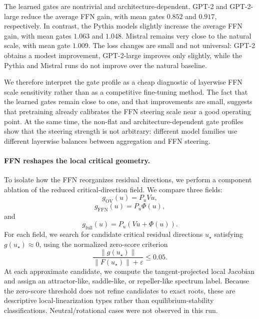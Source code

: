 \documentclass[11pt]{article}
\begin{document}
The learned gates are nontrivial and architecture-dependent. GPT-2 and
GPT-2-large reduce the average FFN gain, with mean gates $0.852$ and $0.917$,
respectively. In contrast, the Pythia models slightly increase the average FFN
gain, with mean gates $1.063$ and $1.048$. Mistral remains very close to the
natural scale, with mean gate $1.009$. The loss changes are small and not
universal: GPT-2 obtains a modest improvement, GPT-2-large improves only
slightly, while the Pythia and Mistral runs do not improve over the natural
baseline.

We therefore interpret the gate profile as a cheap diagnostic of layerwise FFN
scale sensitivity rather than as a competitive fine-tuning method. The fact that
the learned gates remain close to one, and that improvements are small, suggests
that pretraining already calibrates the FFN steering scale near a good operating
point. At the same time, the non-flat and architecture-dependent gate profiles
show that the steering strength is not arbitrary: different model families use
different layerwise balances between aggregation and FFN steering.

\paragraph{FFN reshapes the local critical geometry.}
To isolate how the FFN reorganizes residual directions, we perform a component
ablation of the reduced critical-direction field. We compare three fields:
\begin{equation}
g_{\mathrm{OV}}(u)
=
P_uVu,
\end{equation}
\begin{equation}
g_{\mathrm{FFN}}(u)
=
P_u\Phi(u),
\end{equation}
and
\begin{equation}
g_{\mathrm{full}}(u)
=
P_u\left(Vu+\Phi(u)\right).
\end{equation}
For each field, we search for candidate critical residual directions
$u_\star$ satisfying $g(u_\star)\approx 0$, using the normalized zero-score
criterion
\begin{equation}
\frac{\|g(u_\star)\|}{\|F(u_\star)\|+\varepsilon}
\leq 0.05.
\end{equation}
At each approximate candidate, we compute the tangent-projected local Jacobian
and assign an attractor-like, saddle-like, or repeller-like spectrum label.
Because the zero-score threshold does not refine candidates to exact roots, these
are descriptive local-linearization types rather than equilibrium-stability
classifications. Neutral/rotational cases were not observed in this run.
\end{document}
